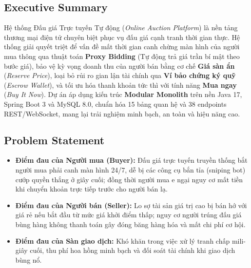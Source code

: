 \documentclass[11pt,a4paper]{article}
\begin{document}
\subsection{Executive Summary}
Hệ thống Đấu giá Trực tuyến Tự động (\textit{Online Auction Platform}) là nền tảng thương mại điện tử chuyên biệt phục vụ đấu giá cạnh tranh thời gian thực. Hệ thống giải quyết triệt để vấn đề mất thời gian canh chừng màn hình của người mua thông qua thuật toán \textbf{Proxy Bidding} (Tự động trả giá trần bí mật theo bước giá), bảo vệ kỳ vọng doanh thu của người bán bằng cơ chế \textbf{Giá sàn ẩn} (\textit{Reserve Price}), loại bỏ rủi ro gian lận tài chính qua \textbf{Ví bảo chứng ký quỹ} (\textit{Escrow Wallet}), và tối ưu hóa thanh khoản tức thì với tính năng \textbf{Mua ngay} (\textit{Buy It Now}). Dự án áp dụng kiến trúc \textbf{Modular Monolith} trên nền Java 17, Spring Boot 3 và MySQL 8.0, chuẩn hóa 15 bảng quan hệ và 38 endpoints REST/WebSocket, mang lại trải nghiệm minh bạch, an toàn và hiệu năng cao.

\subsection{Problem Statement}
\begin{itemize}[leftmargin=*]
    \item \textbf{Điểm đau của Người mua (Buyer):} Đấu giá trực tuyến truyền thống bắt người mua phải canh màn hình 24/7, dễ bị các công cụ bắn tỉa (sniping bot) cướp quyền thắng ở giây cuối; đồng thời người mua e ngại nguy cơ mất tiền khi chuyển khoản trực tiếp trước cho người bán lạ.
    \item \textbf{Điểm đau của Người bán (Seller):} Lo sợ tài sản giá trị cao bị bán hớ với giá rẻ nếu bắt đầu từ mức giá khởi điểm thấp; nguy cơ người trúng đấu giá bùng hàng không thanh toán gây đóng băng hàng hóa và mất chi phí cơ hội.
    \item \textbf{Điểm đau của Sàn giao dịch:} Khó khăn trong việc xử lý tranh chấp mili-giây cuối, thu phí hoa hồng minh bạch và đối soát tài chính khi giao dịch bùng nổ.
\end{itemize}
\end{document}
